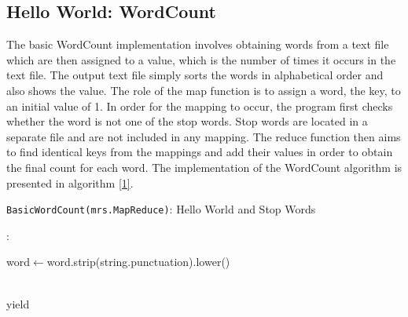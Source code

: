 \documentclass[conference]{IEEEtran}
\begin{document}
\subsection{Hello World: WordCount}
The basic WordCount implementation involves obtaining words from a text file which are then assigned to a value, which is the number of times it occurs in the text file. The output text file simply sorts the words in alphabetical order and also shows the value. The role of the map function is to assign a word, the key, to an initial value of 1. In order for the mapping to occur, the program first checks whether the word is not one of the stop words. Stop words are located in a separate file and are not included in any mapping. The reduce function then aims to find identical keys from the mappings and add their values in order to obtain the final count for each word. The implementation of the WordCount algorithm is presented in algorithm \ref{1}.
\\
\begin{algorithm}[h!]

\centring



\caption{\texttt{BasicWordCount(mrs.MapReduce)}: Hello World and Stop Words}
\vspace{0.5cm}

\map:
   
        {{word$\leftarrow$word.strip(string.punctuation).lower()}}
        

\vspace{0.5cm}
\redu\\


    yield \sum





\label{1}
\end{algorithm}
\end{document}
